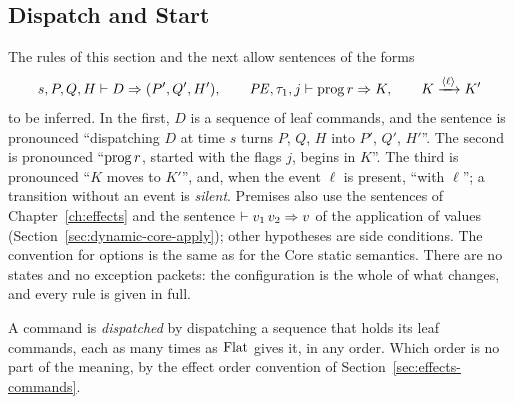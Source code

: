 \subsection{Dispatch and Start}\label{sec:programs-dispatch}

The rules of this section and the next allow sentences of the forms
\[
  s,P,Q,H \vdash D \Rightarrow (P',Q',H'),\qquad
  \mathit{PE},\tau_1,j \vdash \mathrm{prog}\,r \Rightarrow K,\qquad
  K\xrightarrow{\langle \ell\rangle}K'
\]
to be inferred. In the first, $D$ is a sequence of leaf commands, and the
sentence is pronounced ``dispatching $D$ at time $s$ turns $P$, $Q$, $H$ into
$P'$, $Q'$, $H'$''. The second is pronounced ``$\mathrm{prog}\,r$, started with
the flags $j$, begins in $K$''. The third is pronounced ``$K$ moves to $K'$'',
and, when the event $\ell$ is present, ``with $\ell$''; a transition without
an event is \emph{silent}. Premises also use the sentences of
Chapter~\ref{ch:effects} and the sentence $\vdash v_1\,v_2 \Rightarrow v$ of the
application of values (Section~\ref{sec:dynamic-core-apply}); other
hypotheses are side conditions. The convention for options is the same as for
the Core static semantics. There are no states and no exception packets: the
configuration is the whole of what changes, and every rule is given in full.

A command is \emph{dispatched} by dispatching a sequence that holds its leaf
commands, each as many times as $\mathrm{Flat}$ gives it, in any order. Which
order is no part of the meaning, by the effect order convention of
Section~\ref{sec:effects-commands}. %


  {}

  {}

  {}

  {}

